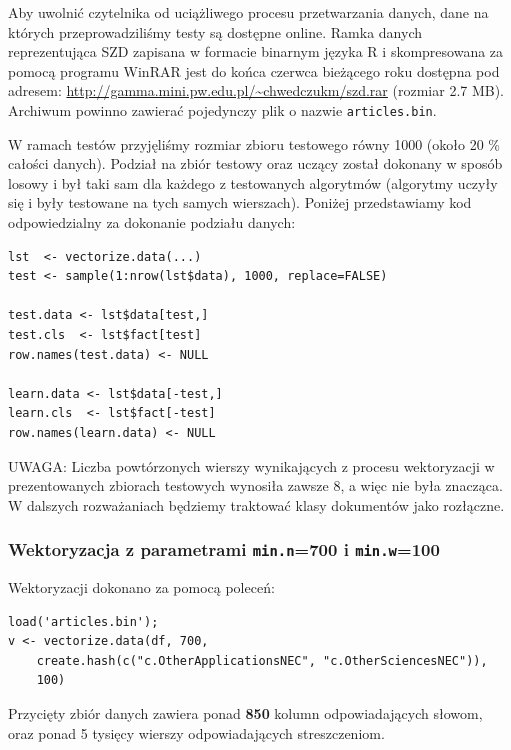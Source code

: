 \documentclass[a4paper,12pt]{article}
\begin{document}
		Aby uwolnić czytelnika od uciążliwego procesu przetwarzania 
		danych, dane na których przeprowadziliśmy testy są 
		dostępne online.
		Ramka danych reprezentująca SZD
		zapisana w formacie binarnym języka R i skompresowana
		za pomocą programu WinRAR jest do końca czerwca bieżącego roku
		dostępna pod adresem: \url{http://gamma.mini.pw.edu.pl/~chwedczukm/szd.rar}
		(rozmiar 2.7 MB). Archiwum powinno zawierać pojedynczy plik o nazwie
		\texttt{articles.bin}.
		
		W ramach testów przyjęliśmy rozmiar zbioru testowego równy 1000
		(około 20 \% całości danych).
		Podział na zbiór testowy oraz uczący został dokonany w sposób
		losowy i był taki sam dla każdego z testowanych algorytmów
		(algorytmy uczyły się i były testowane na tych samych wierszach).
		Poniżej przedstawiamy kod odpowiedzialny za dokonanie 
		podziału danych:
		\begin{verbatim}
lst  <- vectorize.data(...)
test <- sample(1:nrow(lst$data), 1000, replace=FALSE)

test.data <- lst$data[test,]
test.cls  <- lst$fact[test]
row.names(test.data) <- NULL

learn.data <- lst$data[-test,]
learn.cls  <- lst$fact[-test]
row.names(learn.data) <- NULL
		\end{verbatim}
		
		\textsc{UWAGA}: Liczba powtórzonych wierszy wynikających z procesu wektoryzacji
		w prezentowanych zbiorach testowych wynosiła zawsze 8, a więc nie była znacząca.
		W dalszych rozważaniach będziemy traktować klasy dokumentów jako rozłączne.
		
		\subsubsection{Wektoryzacja z parametrami \texttt{min.n}=700 i
		 \texttt{min.w}=100}
		 
		 Wektoryzacji dokonano za pomocą poleceń:
		 \begin{verbatim}
load('articles.bin');
v <- vectorize.data(df, 700, 
	create.hash(c("c.OtherApplicationsNEC", "c.OtherSciencesNEC")),
	100) 
		 \end{verbatim}
		 
		 Przycięty zbiór danych zawiera ponad \textbf{850} kolumn odpowiadających słowom,
		 oraz ponad 5 tysięcy wierszy odpowiadających streszczeniom.
		 
\end{document}
